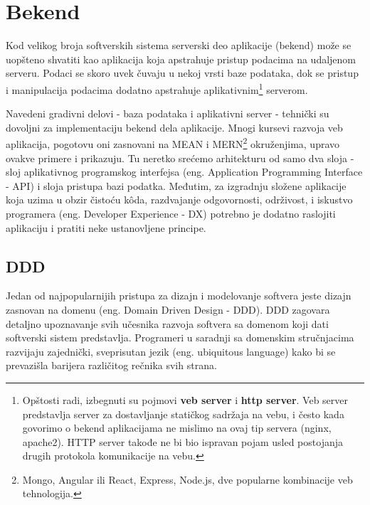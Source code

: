 \documentclass[12pt,oneside]{memoir}
\begin{document}
\chapter{Bekend}
\label{sec:backend}
Kod velikog broja softverskih sistema serverski deo aplikacije (bekend) može se uopšteno shvatiti kao aplikacija koja apstrahuje pristup podacima na udaljenom serveru. Podaci se skoro uvek čuvaju u nekoj vrsti baze podataka, dok se pristup i manipulacija podacima dodatno apstrahuje aplikativnim\footnote{Opštosti radi, izbegnuti su pojmovi \textbf{veb server} i \textbf{http server}. Veb server predstavlja server za dostavljanje statičkog sadržaja na vebu, i često kada govorimo o bekend aplikacijama ne mislimo na ovaj tip servera (nginx, apache2). HTTP server takođe ne bi bio ispravan pojam usled postojanja drugih protokola komunikacije na vebu.} serverom.

Navedeni gradivni delovi - baza podataka i aplikativni server - tehnički su dovoljni za implementaciju bekend dela aplikacije. Mnogi kursevi razvoja veb aplikacija, pogotovu oni zasnovani na MEAN i MERN\footnote{Mongo, Angular ili React, Express, Node.js, dve popularne kombinacije veb tehnologija.} okruženjima, upravo ovakve primere i prikazuju. Tu neretko srećemo arhitekturu od samo dva sloja - sloj aplikativnog programskog interfejsa (eng. Application Programming Interface - API) i sloja pristupa bazi podatka. Međutim, za izgradnju složene aplikacije koja uzima u obzir čistoću k\^{o}da, razdvajanje odgovornosti, održivost, i iskustvo programera (eng. Developer Experience - DX) potrebno je dodatno raslojiti aplikaciju i pratiti neke ustanovljene principe.


\section{DDD}
\label{sec:dddsection}
Jedan od najpopularnijih pristupa za dizajn i modelovanje softvera jeste dizajn zasnovan na domenu (eng. Domain Driven Design - DDD). DDD zagovara detaljno upoznavanje svih učesnika razvoja softvera sa domenom koji dati softverski sistem predstavlja. Programeri u saradnji sa domenskim stručnjacima razvijaju zajednički, sveprisutan jezik (eng. ubiquitous language) kako bi se prevazišla barijera različitog rečnika svih strana. \cite{dddq}
\end{document}
